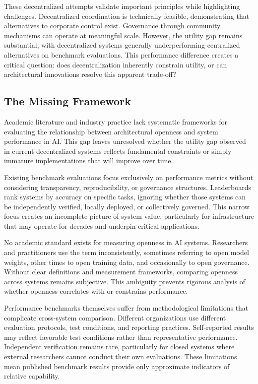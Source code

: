 These decentralized attempts validate important principles while highlighting challenges. Decentralized coordination is technically feasible, demonstrating that alternatives to corporate control exist. Governance through community mechanisms can operate at meaningful scale. However, the utility gap remains substantial, with decentralized systems generally underperforming centralized alternatives on benchmark evaluations. This performance difference creates a critical question: does decentralization inherently constrain utility, or can architectural innovations resolve this apparent trade-off?

\subsection{The Missing Framework}

Academic literature and industry practice lack systematic frameworks for evaluating the relationship between architectural openness and system performance in AI. This gap leaves unresolved whether the utility gap observed in current decentralized systems reflects fundamental constraints or simply immature implementations that will improve over time.

Existing benchmark evaluations focus exclusively on performance metrics without considering transparency, reproducibility, or governance structures. Leaderboards rank systems by accuracy on specific tasks, ignoring whether those systems can be independently verified, locally deployed, or collectively governed. This narrow focus creates an incomplete picture of system value, particularly for infrastructure that may operate for decades and underpin critical applications.

No academic standard exists for measuring openness in AI systems. Researchers and practitioners use the term inconsistently, sometimes referring to open model weights, other times to open training data, and occasionally to open governance. Without clear definitions and measurement frameworks, comparing openness across systems remains subjective. This ambiguity prevents rigorous analysis of whether openness correlates with or constrains performance.

Performance benchmarks themselves suffer from methodological limitations that complicate cross-system comparison. Different organizations use different evaluation protocols, test conditions, and reporting practices. Self-reported results may reflect favorable test conditions rather than representative performance. Independent verification remains rare, particularly for closed systems where external researchers cannot conduct their own evaluations. These limitations mean published benchmark results provide only approximate indicators of relative capability.

